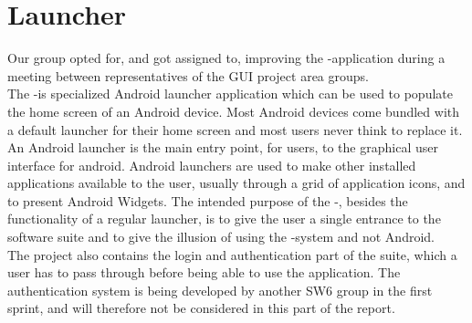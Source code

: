 
\section{Launcher}

Our group opted for, and got assigned to, improving the \giraf-\launcher application during a meeting between representatives of the GUI project area groups.\\

The \giraf-\launcher is specialized Android launcher application which can be used to populate the home screen of an Android device. Most Android devices come bundled with a default launcher for their home screen and most users never think to replace it. An Android launcher is the main entry point, for users, to the graphical user interface for android. Android launchers are used to make other installed applications available to the user, usually through a grid of application icons, and to present Android Widgets. The intended purpose of the \giraf-\launcher, besides the functionality of a regular launcher, is to give the user a single entrance to the \giraf software suite and to give the illusion of using the \giraf-system and not Android.\\

The \launcher project also contains the login and authentication part of the \giraf suite, which a user has to pass through before being able to use the application. The authentication system is being developed by another SW6 group in the first sprint, and will therefore not be considered in this part of the report. 

